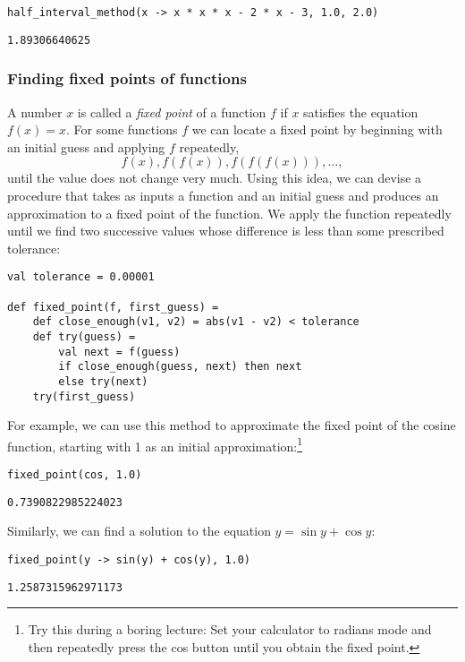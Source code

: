 \begin{lstlisting}[style=slate]
half_interval_method(x -> x * x * x - 2 * x - 3, 1.0, 2.0)
\end{lstlisting}
\begin{verbatim}
1.89306640625
\end{verbatim}

\subsubsection{Finding fixed points of functions}

A number $x$ is called a \emph{fixed point} of a function $f$ if $x$ satisfies the equation $f(x) = x$. For some functions $f$ we can locate a fixed point by beginning with an initial guess and applying $f$ repeatedly,
\[
f(x), f(f(x)), f(f(f(x))), \ldots,
\]
until the value does not change very much. Using this idea, we can devise a procedure  that takes as inputs a function and an initial guess and produces an approximation to a fixed point of the function. We apply the function repeatedly until we find two successive values whose difference is less than some prescribed tolerance:

\begin{lstlisting}[style=slate]
val tolerance = 0.00001

def fixed_point(f, first_guess) =
    def close_enough(v1, v2) = abs(v1 - v2) < tolerance
    def try(guess) =
        val next = f(guess)
        if close_enough(guess, next) then next
        else try(next)
    try(first_guess)
\end{lstlisting}

For example, we can use this method to approximate the fixed point of the cosine function, starting with 1 as an initial approximation:\footnote{Try this during a boring lecture: Set your calculator to radians mode and then repeatedly press the cos button until you obtain the fixed point.}

\begin{lstlisting}[style=slate]
fixed_point(cos, 1.0)
\end{lstlisting}
\begin{verbatim}
0.7390822985224023
\end{verbatim}

Similarly, we can find a solution to the equation $y = \sin y + \cos y$:

\begin{lstlisting}[style=slate]
fixed_point(y -> sin(y) + cos(y), 1.0)
\end{lstlisting}
\begin{verbatim}
1.2587315962971173
\end{verbatim}

